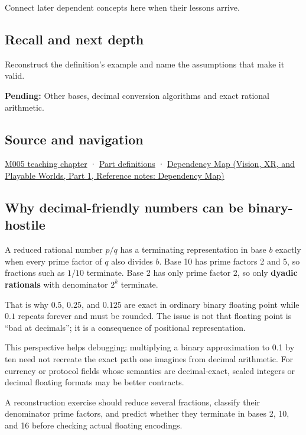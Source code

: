 \hypertarget{appendix-2a2f1b74bdd3-used-by}{}

Connect later dependent concepts here when their lessons arrive.

\subsection{Recall and next depth}\label{appendix-2a2f1b74bdd3-recall-and-next-depth}

\hypertarget{appendix-2a2f1b74bdd3-recall-and-next-depth}{}

Reconstruct the definition's example and name the assumptions that make it valid.

\textbf{Pending:} Other bases, decimal conversion algorithms and exact rational arithmetic.

\subsection{Source and navigation}\label{appendix-2a2f1b74bdd3-source-and-navigation}

\hypertarget{appendix-2a2f1b74bdd3-source-and-navigation}{}

\hyperref[01-foundations-i-ch001-when-arithmetic-meets-uncertainty]{M005 teaching chapter} · \hyperref[appendix-fd090d982a15-m005---parts-77-88]{Part definitions} · \href{../07-Vision-XR-and-Playable-Worlds-P01/main.pdf\#nameddest=appendix-4ad47bdd269a}{Dependency Map (Vision, XR, and Playable Worlds, Part 1, Reference notes: Dependency Map)}

\subsection{Why decimal-friendly numbers can be binary-hostile}\label{appendix-2a2f1b74bdd3-why-decimal-friendly-numbers-can-be-binary-hostile}

\hypertarget{appendix-2a2f1b74bdd3-why-decimal-friendly-numbers-can-be-binary-hostile}{}

A reduced rational number \(p/q\) has a terminating representation in base \(b\) exactly when every prime factor of \(q\) also divides \(b\). Base 10 has prime factors 2 and 5, so fractions such as \(1/10\) terminate. Base 2 has only prime factor 2, so only \textbf{dyadic rationals} with denominator \(2^k\) terminate.

That is why \(0.5\), \(0.25\), and \(0.125\) are exact in ordinary binary floating point while \(0.1\) repeats forever and must be rounded. The issue is not that floating point is ``bad at decimals''; it is a consequence of positional representation.

This perspective helps debugging: multiplying a binary approximation to 0.1 by ten need not recreate the exact path one imagines from decimal arithmetic. For currency or protocol fields whose semantics are decimal-exact, scaled integers or decimal floating formats may be better contracts.

A reconstruction exercise should reduce several fractions, classify their denominator prime factors, and predict whether they terminate in bases 2, 10, and 16 before checking actual floating encodings.
